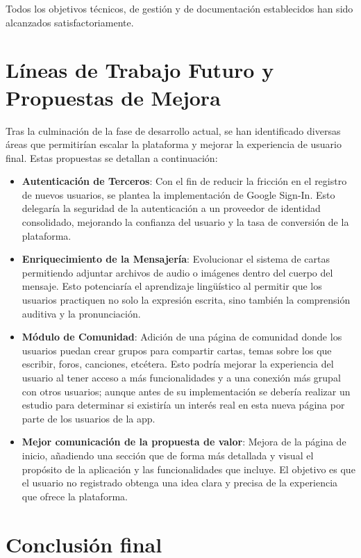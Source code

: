 Todos los objetivos técnicos, de gestión y de documentación establecidos han sido alcanzados satisfactoriamente.

\section{Líneas de Trabajo Futuro y Propuestas de Mejora}

Tras la culminación de la fase de desarrollo actual, se han identificado diversas áreas que permitirían escalar la plataforma y mejorar la experiencia de usuario final. Estas propuestas se detallan a continuación:

\begin{itemize}
    \item \textbf{Autenticación de Terceros}: Con el fin de reducir la fricción en el registro de nuevos usuarios, se plantea la implementación de Google Sign-In. Esto delegaría la seguridad de la autenticación a un proveedor de identidad consolidado, mejorando la confianza del usuario y la tasa de conversión de la plataforma.

    \item \textbf{Enriquecimiento de la Mensajería}: Evolucionar el sistema de cartas permitiendo adjuntar archivos de audio o imágenes dentro del cuerpo del mensaje. Esto potenciaría el aprendizaje lingüístico al permitir que los usuarios practiquen no solo la expresión escrita, sino también la comprensión auditiva y la pronunciación.

    \item \textbf{Módulo de Comunidad}: Adición de una página de comunidad donde los usuarios puedan crear grupos para compartir cartas, temas sobre los que escribir, foros, canciones, etcétera. Esto podría mejorar la experiencia del usuario al tener acceso a más funcionalidades y a una conexión más grupal con otros usuarios; aunque antes de su implementación se debería realizar un estudio para determinar si existiría un interés real en esta nueva página por parte de los usuarios de la app.
    \item \textbf{Mejor comunicación de la propuesta de valor}: Mejora de la página de inicio, añadiendo una sección que de forma más detallada y visual el propósito de la aplicación y las funcionalidades que incluye. El objetivo es que el usuario no registrado obtenga una idea clara y precisa de la experiencia que ofrece la plataforma.
\end{itemize}


\section{Conclusión final}

